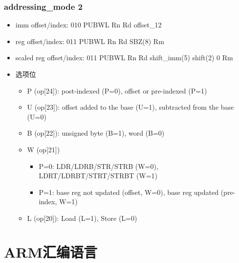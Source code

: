 \documentclass[10pt]{book}
\begin{document}
\subsection{addressing\_mode 2}
\begin{itemize}
  \item imm offset/index: 010 PUBWL Rn Rd offset\_12
  \item reg offset/index: 011 PUBWL Rn Rd SBZ(8) Rm
  \item scaled reg offset/index: 011 PUBWL Rn Rd shift\_imm(5) shift(2) 0 Rm
  \item 选项位
  \begin{itemize}
    \item P (op[24]): post-indexed (P=0), offset or pre-indexed (P=1)
    \item U (op[23]): offset added to the base (U=1), subtracted from the base (U=0)
    \item B (op[22]): unsigned byte (B=1), word (B=0)
    \item W (op[21])
    \begin{itemize}
      \item P=0: LDR/LDRB/STR/STRB (W=0), LDRT/LDRBT/STRT/STRBT (W=1)
      \item P=1: base reg not updated (offset, W=0), base reg updated (pre-index, W=1)
    \end{itemize}
    \item L (op[20]): Load (L=1), Store (L=0)
  \end{itemize}
\end{itemize}

\chapter{ARM汇编语言}
\end{document}
